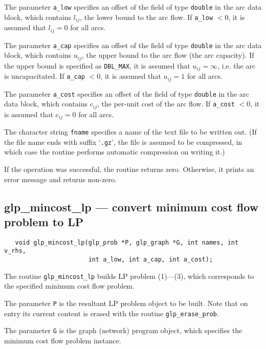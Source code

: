 \documentclass[11pt]{report}
\def\para#1{\noindent{\bf#1}}
\def\synopsis{\para{Synopsis}}
\def\description{\para{Description}}
\def\returns{\para{Returns}}
\begin{document}
The parameter \verb|a_low| specifies an offset of the field of type
\verb|double| in the arc data block, which contains $l_{ij}$, the lower
bound to the arc flow. If \verb|a_low| $<0$, it is assumed that
$l_{ij}=0$ for all arcs.

The parameter \verb|a_cap| specifies an offset of the field of type
\verb|double| in the arc data block, which contains $u_{ij}$, the upper
bound to the arc flow (the arc capacity). If the upper bound is
specified as \verb|DBL_MAX|, it is assumed that $u_{ij}=\infty$, i.e.
the arc is uncapacitated. If \verb|a_cap| $<0$, it is assumed that
$u_{ij}=1$ for all arcs.

The parameter \verb|a_cost| specifies an offset of the field of type
\verb|double| in the arc data block, which contains $c_{ij}$, the
per-unit cost of the arc flow. If \verb|a_cost| $<0$, it is assumed
that $c_{ij}=0$ for all arcs.

The character string \verb|fname| specifies a name of the text file to
be written out. (If the file name ends with suffix `\verb|.gz|', the
file is assumed to be compressed, in which case the routine performs
automatic compression on writing it.)

\returns

If the operation was successful, the routine returns zero. Otherwise,
it prints an error message and returns non-zero.

\newpage

\subsection{glp\_mincost\_lp --- convert minimum cost flow problem
to LP}

\synopsis

\begin{verbatim}
   void glp_mincost_lp(glp_prob *P, glp_graph *G, int names, int v_rhs,
                       int a_low, int a_cap, int a_cost);
\end{verbatim}

\description

The routine \verb|glp_mincost_lp| builds LP problem (1)---(3), which
corresponds to the specified minimum cost flow problem.

The parameter \verb|P| is the resultant LP problem object to be built.
Note that on entry its current content is erased with the routine
\verb|glp_erase_prob|.

The parameter \verb|G| is the graph (network) program object, which
specifies the minimum cost flow problem instance.
\end{document}

